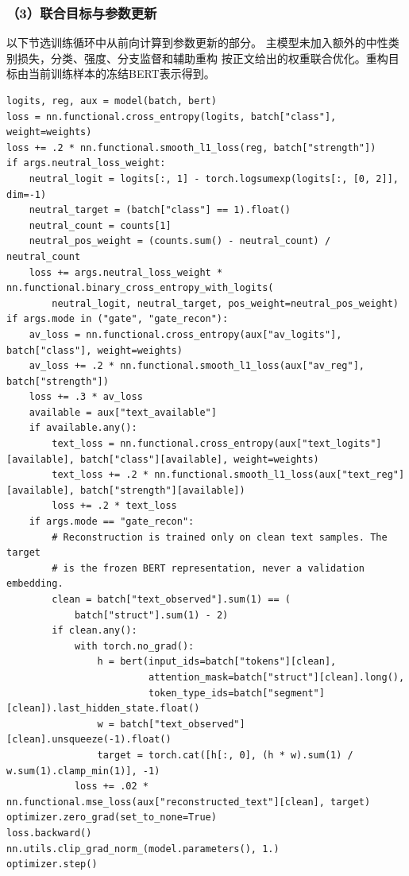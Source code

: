 \subsubsection*{（3）联合目标与参数更新}
以下节选训练循环中从前向计算到参数更新的部分。
主模型未加入额外的中性类别损失，分类、强度、分支监督和辅助重构
按正文给出的权重联合优化。重构目标由当前训练样本的冻结BERT表示得到。

\begin{lstlisting}
logits, reg, aux = model(batch, bert)
loss = nn.functional.cross_entropy(logits, batch["class"], weight=weights)
loss += .2 * nn.functional.smooth_l1_loss(reg, batch["strength"])
if args.neutral_loss_weight:
    neutral_logit = logits[:, 1] - torch.logsumexp(logits[:, [0, 2]], dim=-1)
    neutral_target = (batch["class"] == 1).float()
    neutral_count = counts[1]
    neutral_pos_weight = (counts.sum() - neutral_count) / neutral_count
    loss += args.neutral_loss_weight * nn.functional.binary_cross_entropy_with_logits(
        neutral_logit, neutral_target, pos_weight=neutral_pos_weight)
if args.mode in ("gate", "gate_recon"):
    av_loss = nn.functional.cross_entropy(aux["av_logits"], batch["class"], weight=weights)
    av_loss += .2 * nn.functional.smooth_l1_loss(aux["av_reg"], batch["strength"])
    loss += .3 * av_loss
    available = aux["text_available"]
    if available.any():
        text_loss = nn.functional.cross_entropy(aux["text_logits"][available], batch["class"][available], weight=weights)
        text_loss += .2 * nn.functional.smooth_l1_loss(aux["text_reg"][available], batch["strength"][available])
        loss += .2 * text_loss
    if args.mode == "gate_recon":
        # Reconstruction is trained only on clean text samples. The target
        # is the frozen BERT representation, never a validation embedding.
        clean = batch["text_observed"].sum(1) == (
            batch["struct"].sum(1) - 2)
        if clean.any():
            with torch.no_grad():
                h = bert(input_ids=batch["tokens"][clean],
                         attention_mask=batch["struct"][clean].long(),
                         token_type_ids=batch["segment"][clean]).last_hidden_state.float()
                w = batch["text_observed"][clean].unsqueeze(-1).float()
                target = torch.cat([h[:, 0], (h * w).sum(1) / w.sum(1).clamp_min(1)], -1)
            loss += .02 * nn.functional.mse_loss(aux["reconstructed_text"][clean], target)
optimizer.zero_grad(set_to_none=True)
loss.backward()
nn.utils.clip_grad_norm_(model.parameters(), 1.)
optimizer.step()
\end{lstlisting}

